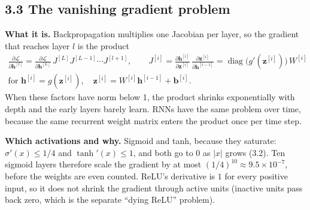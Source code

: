\documentclass[11pt]{article}
\DeclareMathOperator{\diag}{diag}
\begin{document}
\subsection*{3.3 The vanishing gradient problem}
\textbf{What it is.} Backpropagation multiplies one Jacobian per layer, so the gradient that reaches layer $l$ is the product
\begin{gather*}
\frac{\partial \mathcal{L}}{\partial \mathbf{h}^{[l]}} = \frac{\partial \mathcal{L}}{\partial \mathbf{h}^{[L]}}\,J^{[L]}J^{[L-1]}\cdots J^{[l+1]},
\qquad
J^{[i]} = \frac{\partial\mathbf{h}^{[i]}}{\partial\mathbf{z}^{[i]}}\,\frac{\partial\mathbf{z}^{[i]}}{\partial\mathbf{h}^{[i-1]}} = \diag\big(g'(\mathbf{z}^{[i]})\big)\,W^{[i]}\\
\text{for } \mathbf{h}^{[i]} = g(\mathbf{z}^{[i]}),\quad \mathbf{z}^{[i]} = W^{[i]}\mathbf{h}^{[i-1]}+\mathbf{b}^{[i]}.
\end{gather*}
When these factors have norm below 1, the product shrinks exponentially with depth and the early layers barely learn. RNNs have the same problem over time, because the same recurrent weight matrix enters the product once per time step.

\textbf{Which activations and why.} Sigmoid and tanh, because they saturate: $\sigma'(x)\le 1/4$ and $\tanh'(x)\le 1$, and both go to $0$ as $|x|$ grows (3.2). Ten sigmoid layers therefore scale the gradient by at most $(1/4)^{10}\approx 9.5\times 10^{-7}$, before the weights are even counted. ReLU's derivative is $1$ for every positive input, so it does not shrink the gradient through active units (inactive units pass back zero, which is the separate ``dying ReLU'' problem).
\end{document}
